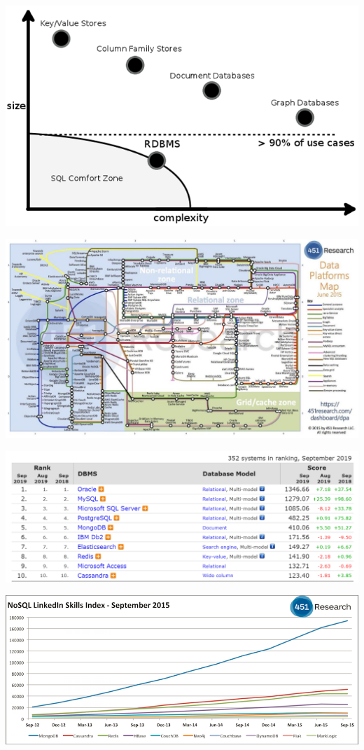\documentclass[]{book}
\begin{document}
\includegraphics{images/TiposBBDDNoSQL2.png}

\includegraphics{images/451ResearchMap.png}

\includegraphics{images/DBEnginesRanking.png}

\includegraphics{images/451ResearchSkills.png}
\end{document}
